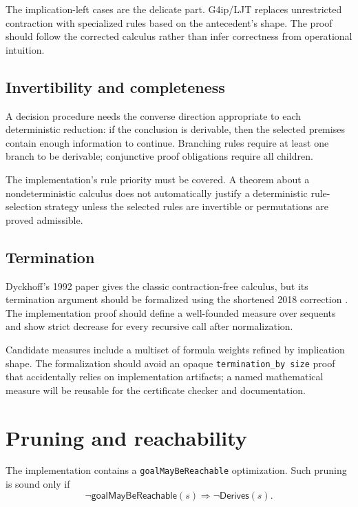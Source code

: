 \documentclass[11pt,letterpaper,openany]{report}
\theoremstyle{definition}
\theoremstyle{remark}
\newcommand{\code}[1]{\texttt{#1}}
\begin{document}
The implication-left cases are the delicate part. G4ip/LJT replaces unrestricted contraction with specialized rules based on the antecedent's shape. The proof should follow the corrected calculus rather than infer correctness from operational intuition.

\subsection{Invertibility and completeness}

A decision procedure needs the converse direction appropriate to each deterministic reduction: if the conclusion is derivable, then the selected premises contain enough information to continue. Branching rules require at least one branch to be derivable; conjunctive proof obligations require all children.

The implementation's rule priority must be covered. A theorem about a nondeterministic calculus does not automatically justify a deterministic rule-selection strategy unless the selected rules are invertible or permutations are proved admissible.

\subsection{Termination}

Dyckhoff's 1992 paper gives the classic contraction-free calculus, but its termination argument should be formalized using the shortened 2018 correction \cite{dyckhoff1992,dyckhoff2018,dyckhoffnegri2000}. The implementation proof should define a well-founded measure over sequents and show strict decrease for every recursive call after normalization.

Candidate measures include a multiset of formula weights refined by implication shape. The formalization should avoid an opaque \code{termination\_by size} proof that accidentally relies on implementation artifacts; a named mathematical measure will be reusable for the certificate checker and documentation.

\section{Pruning and reachability}
\label{sec:pruning}

The implementation contains a \code{goalMayBeReachable} optimization. Such pruning is sound only if
\[
  \neg\mathsf{goalMayBeReachable}(s)
  \Longrightarrow
  \neg\mathsf{Derives}(s).
\]
\end{document}
